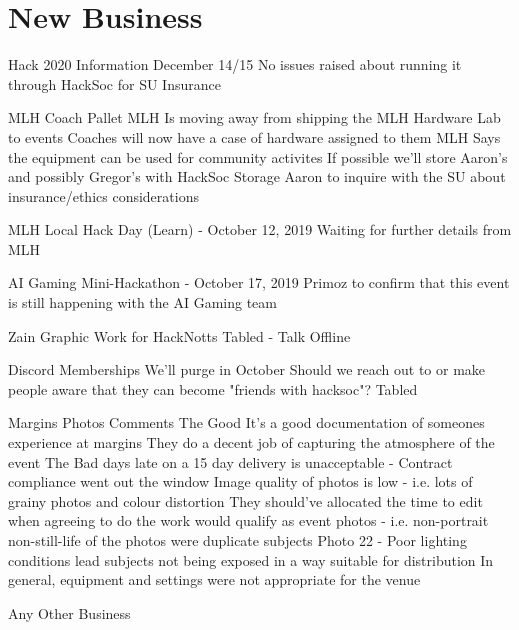 \documentclass[11pt,hacksoc]{meetingmins}
\begin{document}
\section{New Business}
\begin{items}
	\item Hack 2020 Information
		\subitem December 14/15
		\subitem No issues raised about running it through HackSoc for SU Insurance
	\item MLH Coach Pallet
		\subitem MLH Is moving away from shipping the MLH Hardware Lab to events
		\subitem Coaches will now have a case of hardware assigned to them
		\subitem MLH Says the equipment can be used for community activites
		\subitem If possible we'll store Aaron's and possibly Gregor's with HackSoc Storage
		\subitem Aaron to inquire with the SU about insurance/ethics considerations
	\item MLH Local Hack Day (Learn) - October 12, 2019
		\subitem Waiting for further details from MLH
	\item AI Gaming Mini-Hackathon - October 17, 2019
		\subitem Primoz to confirm that this event is still happening with the AI Gaming team
	\item Zain Graphic Work for HackNotts
		\subitem Tabled - Talk Offline
	\item Discord Memberships
		\subitem We'll purge in October
		\subitem Should we reach out to or make people aware that they can become "friends with hacksoc"?
			\subsubitem Tabled
	\item Margins Photos Comments
		\subitem The Good
			\subsubitem It's a good documentation of someones experience at margins
			\subsubitem They do a decent job of capturing the atmosphere of the event
		\subitem The Bad
			 days late on a 15 day delivery is unacceptable - Contract compliance went out the window
			\subsubitem Image quality of photos is low - i.e. lots of grainy photos and colour distortion
			\subsubitem They should've allocated the time to edit when agreeing to do the work
			 would qualify as event photos - i.e. non-portrait non-still-life
			 of the photos were duplicate subjects
			\subsubitem Photo 22 - Poor lighting conditions lead subjects not being exposed in a way suitable for distribution
			\subsubitem In general, equipment and settings were not appropriate for the venue
	\item Any Other Business
\end{items}

\vspace{1em}
\end{document}
